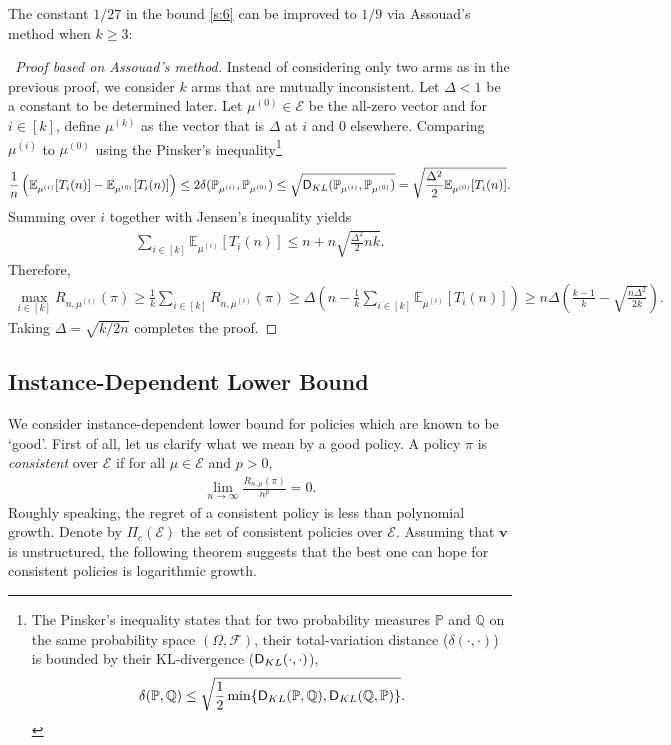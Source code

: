 \documentclass[letterpaper,11pt,openright,openany]{book}
\numberwithin{equation}{section}
\theoremstyle{plain}
\theoremstyle{definition}
\def\Q{{\mathbb Q}}
\def\E{{\mathbb E}}
\def\P{{\mathbb P}}
\def\V{{\mathcal E}}
\def\v{{\mathbf{v}}}
\begin{document}
The constant $1/27$ in the bound \eqref{s:6} can be improved to $1/9$ via Assouad's method when $k\geq 3$: 

\begin{proof}[~Proof based on Assouad's method]
Instead of considering only two arms as in the previous proof, we consider $k$ arms that are mutually inconsistent. Let $\Delta<1$ be a constant to be determined later. Let $\mu^{(0)}\in\mathcal E$ be the all-zero vector and for $i\in [k]$, define $\mu^{(k)}$ as the vector that is $\Delta$ at $i$ and $0$ elsewhere. Comparing $\mu^{(i)}$ to $\mu^{(0)}$ using the Pinsker's inequality\footnote{The Pinsker's inequality states that for two probability measures $\P$ and $\Q$ on the same probability space $(\Omega, \mathcal{F})$, their total-variation distance ($\delta(\cdot, \cdot)$) is bounded by their KL-divergence ($\textsf D_{KL}(\cdot, \cdot)$), 
\begin{align}
\delta (\P, \Q)\leq\sqrt{\frac{1}{2}\min\{\textsf D_{KL}(\P, \Q), \textsf D_{KL}(\Q, \P)\}}. \label{s:pinsker}
\end{align}} 
\begin{align*}
\frac{1}{n}\left(\E_{\mu^{(i)}}[T_i(n)]-\E_{\mu^{(0)}}[T_i(n)]\right)\leq 2\delta(\P_{\mu^{(i)}}, \P_{\mu^{(0)}})\leq\sqrt{\textsf D_{KL}(\P_{\mu^{(i)}}, \P_{\mu^{(0)}})}=\sqrt{\frac{\Delta^2}{2}\E_{\mu^{(0)}}[T_i(n)]}. 
\end{align*}
Summing over $i$ together with Jensen's inequality yields
\begin{align*}
\sum_{i\in [k]}\E_{\mu^{(i)}}[T_i(n)]\leq n+n\sqrt{\frac{\Delta^2}{2}nk}. 
\end{align*}
Therefore,
\begin{align*}
\max_{i\in [k]}R_{n, \mu^{(i)}}(\pi)\geq\frac{1}{k}\sum_{i\in [k]}R_{n, \mu^{(i)}}(\pi)\geq \Delta\left(n-\frac{1}{k}\sum_{i\in [k]}\E_{\mu^{(i)}}[T_i(n)]\right)\geq n\Delta\left(\frac{k-1}{k}-\sqrt{\frac{n\Delta^2}{2k}}\right). 
\end{align*}
Taking $\Delta=\sqrt{k/2n}$ completes the proof. 
\end{proof}


\subsection{Instance-Dependent Lower Bound}

We consider instance-dependent lower bound for policies which are known to be `good'. First of all, let us clarify what we mean by a good policy. A policy $\pi$ is \emph{consistent} over $\V$ if for all $\mu\in\V$ and $p>0$, 
\begin{align*}
\lim_{n\rightarrow\infty}\frac{R_{n, \mu}(\pi)}{n^p} = 0. 
\end{align*}
Roughly speaking, the regret of a consistent policy is less than polynomial growth. Denote by $\Pi_{c}(\V)$ the set of consistent policies over $\V$. Assuming that $\v$ is unstructured, the following theorem suggests that the best one can hope for consistent policies is logarithmic growth. 
\end{document}
